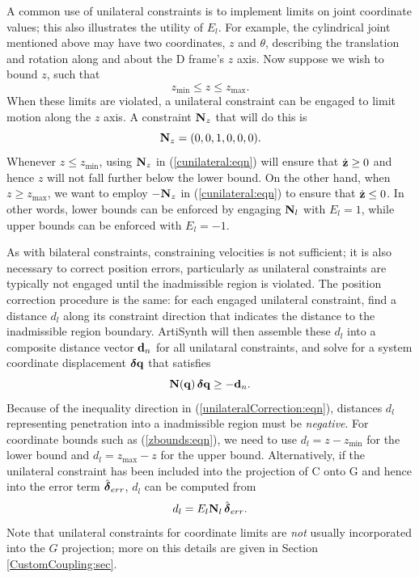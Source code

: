 A common use of unilateral constraints is to implement limits on joint
coordinate values; this also illustrates the utility of $E_l$.  For
example, the cylindrical joint mentioned above may have two
coordinates, $z$ and $\theta$, describing the translation and rotation
along and about the D frame's $z$ axis.  Now suppose we wish to bound
$z$, such that
%
\begin{equation}
z_\text{min} \le z \le z_\text{max}.
\label{zbounds:eqn}
\end{equation}
%
When these limits are violated, a unilateral constraint can be engaged
to limit motion along the $z$ axis.
A constraint ${\bf N}_z$
that will do this is 
%
\begin{equation*}
{\bf N}_z = (0, 0, 1, 0, 0, 0).
\end{equation*}
%
Whenever $z \le z_\text{min}$, using ${\bf N}_z$ in (\ref{cunilateral:eqn})
will ensure that $\dot{{\bf z}} \ge 0$ and hence $z$ will not fall further
below the lower bound.  On the other hand, when $z \ge z_\text{max}$,
we want to employ $-{\bf N}_z$ in (\ref{cunilateral:eqn}) to ensure that
$\dot{{\bf z}} \le 0$. In other words, lower bounds can be enforced by
engaging ${\bf N}_l$ with $E_l = 1$, while upper bounds can be enforced
with $E_l = -1$.

As with bilateral constraints, constraining velocities is not
sufficient; it is also necessary to correct position errors,
particularly as unilateral constraints are typically not engaged until
the inadmissible region is violated. The position correction procedure
is the same: for each engaged unilateral constraint, find a distance
$d_l$ along its constraint direction that indicates the distance to
the inadmissible region boundary.  ArtiSynth will then assemble these
$d_l$ into a composite distance vector ${\bf d}_n$ for all unilataral
constraints, and solve for a system coordinate displacement $\boldsymbol\delta {\bf q}$
that satisfies
%
\begin{equation}
{\bf N}({\bf q}) \, \boldsymbol\delta {\bf q} \ge -{\bf d}_n.
\label{unilateralCorrection:eqn}
\end{equation}
%
Because of the inequality direction in
(\ref{unilateralCorrection:eqn}), distances $d_l$ representing
penetration into a inadmissible region must be {\it negative}.  For
coordinate bounds such as (\ref{zbounds:eqn}), we need to use $d_l = z
- z_\text{min}$ for the lower bound and $d_l = z_\text{max} - z$ for
the upper bound. Alternatively, if the unilateral constraint has been
included into the projection of C onto G and hence into the error term
$\hat{\boldsymbol\delta}_{err}$, $d_l$ can be computed from
%
\begin{equation}
d_l = E_l {\bf N}_l \, \hat{\boldsymbol\delta}_{err}.
\end{equation}
%
Note that unilateral constraints for coordinate limits are {\it not}
usually incorporated into the $G$ projection; more on this details are
given in Section \ref{CustomCoupling:sec}.

